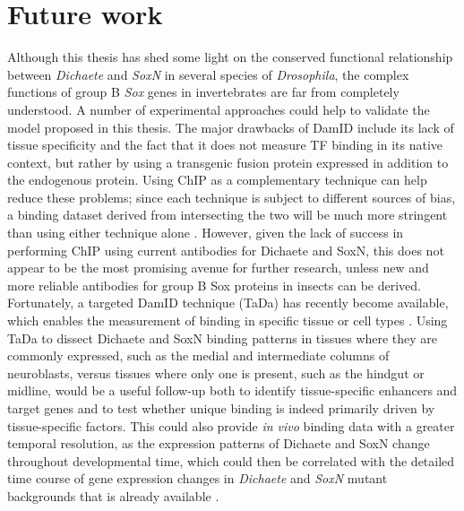 \section{Future work}
Although this thesis has shed some light on the conserved functional relationship between \emph{Dichaete} and \emph{SoxN} in several species of \emph{Drosophila}, the complex functions of group B \emph{Sox} genes in invertebrates are far from completely understood. A number of experimental approaches could help to validate the model proposed in this thesis. The major drawbacks of DamID include its lack of tissue specificity and the fact that it does not measure TF binding in its native context, but rather by using a transgenic fusion protein expressed in addition to the endogenous protein. Using ChIP as a complementary technique can help reduce these problems; since each technique is subject to different sources of bias, a binding dataset derived from intersecting the two will be much more stringent than using either technique alone \citep{aleksic_role_2013}. However, given the lack of success in performing ChIP using current antibodies for Dichaete and SoxN, this does not appear to be the most promising avenue for further research, unless new and more reliable antibodies for group B Sox proteins in insects can be derived. Fortunately, a targeted DamID technique (TaDa) has recently become available, which enables the measurement of binding in specific tissue or cell types \citep{southall_cell-type-specific_2013}. Using TaDa to dissect Dichaete and SoxN binding patterns in tissues where they are commonly expressed, such as the medial and intermediate columns of neuroblasts, versus tissues where only one is present, such as the hindgut or midline, would be a useful follow-up both to identify tissue-specific enhancers and target genes and to test whether unique binding is indeed primarily driven by tissue-specific factors. This could also provide \emph{in vivo} binding data with a greater temporal resolution, as the expression patterns of Dichaete and SoxN change throughout developmental time, which could then be correlated with the detailed time course of gene expression changes in \emph{Dichaete} and \emph{SoxN} mutant backgrounds that is already available \citep{ferrero_soxneuro_2014}.\\

